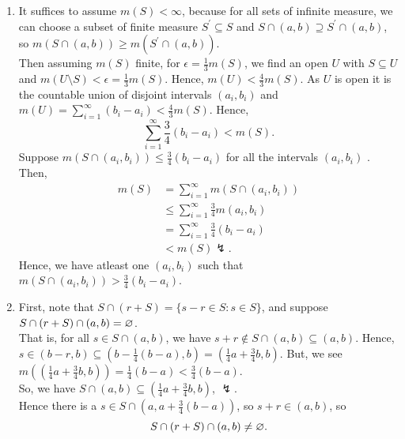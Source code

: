 \documentclass[a4paper]{article}
\begin{document}
\newpage
\begin{solution}[22]
\begin{enumerate}
	\item It suffices to assume \(m\left( S \right)  < \infty\), because for all sets of infinite measure, we can choose a subset of finite measure  \(S^{\prime} \subseteq S\)  and  \(S \cap \left( a, b \right)  \supseteq S^{\prime} \cap \left( a, b \right) \), so \(m\left( S \cap \left( a, b \right)  \right) \ge m\left( S^{\prime} \cap \left( a, b \right)  \right) \).\\
		Then assuming \(m\left( S \right) \) finite, for \(\epsilon = \frac{1}{3} m\left( S \right) \), we find an open \(U\) with \(S \subseteq U\) and \(m\left( U \setminus S \right)  < \epsilon = \frac{1}{3} m\left( S \right) \). Hence, \(m\left( U \right)  < \frac{4}{3} m\left( S \right) \). As \(U\) is open it is the countable union of disjoint intervals \(\left( a_{i}, b_{i} \right) \) and \( m\left( U \right)  = \sum_{i= 1}^{\infty} \left( b_{i} - a_{i} \right) < \frac{4}{3} m\left( S \right)  \). Hence, \[
			\sum_{i= 1}^{\infty} \frac{3}{4}\left( b_{i} - a_{i} \right) < m\left( S \right)
		.\]
		Suppose \(m\left( S \cap \left( a_{i}, b_{i} \right)  \right) \le \frac{3}{4}\left( b_{i}-a_{i} \right) \) for all the intervals \(\left( a_{i}, b_{i} \right) \) . Then,
		\begin{align*}
			m\left( S \right)  &= \sum_{i= 1}^{\infty} m\left( S \cap\left( a_{i}, b_{i} \right)  \right) \\
					   &\le \sum_{i= 1}^{\infty} \frac{3}{4}m\left( a_{i}, b_{i} \right)\\
					   &= \sum_{i= 1}^{\infty} \frac{3}{4} \left( b_{i} - a_{i} \right) \\
					   &< m\left( S \right) \lightning
		.\end{align*}
		Hence, we have atleast one \(\left( a_{i}, b_{i} \right) \) such that \(m\left( S \cap \left( a_{i}, b_{i} \right)  \right) > \frac{3}{4}\left( b_{i}-a_{i} \right)  \).
	\item First, note that \(S \cap \left( r + S \right)  = \{s - r \in S : s \in S\} \), and suppose \\\(S \cap \left( r + S \right)  \cap \left( a, b \right)  = \varnothing\). \\That is, for all \(s \in S \cap \left( a, b \right) \), we have \(s + r \not\in S \cap \left( a, b \right) \subseteq \left( a, b \right)  \). Hence, \(s \in \left( b-r, b \right) \subseteq \left( b -  \frac{1}{4}\left( b-a \right) , b \right)   = \left( \frac{1}{4}a + \frac{3}{4}b, b \right)  \). But, we see \(m\left( \left( \frac{1}{4}a + \frac{3}{4}b, b \right)  \right)  = \frac{1}{4} ( b - a) < \frac{3}{4} \left( b-a \right)  \). \\So, we have \(S \cap \left( a, b \right) \subseteq \left( \frac{1}{4}a + \frac{3}{4}b, b \right) \), \(\lightning\). \\ Hence there is a \(s \in S \cap \left( a, a + \frac{3}{4}(b - a) \right) \), so \(s + r \in \left( a, b \right) \), so \[S \cap \left( r + S \right)  \cap \left( a, b \right) \neq \varnothing .\]

\end{enumerate}
\end{solution}
\end{document}
